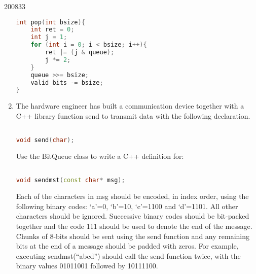 \documentclass[10pt,\jkfside,a4paper]{article}
\begin{document}
\begin{examquestion}{2008}{3}{3}
\begin{enumerate}[label=(\alph*)]
\begin{lstlisting}[language=C++]
int pop(int bsize){
	int ret = 0;
	int j = 1;
	for (int i = 0; i < bsize; i++){
		ret |= (j & queue);
		j *= 2;
	}
	queue >>= bsize;
	valid_bits -= bsize;
}

\end{lstlisting}

\item The hardware engineer has built a communication device together with a
C++ library function send to transmit data with the following declaration.

\begin{lstlisting}[language=C++]

void send(char);

\end{lstlisting}

Use the BitQueue class to write a C++ definition for:

\begin{lstlisting}[language=C++]

void sendmst(const char* msg);

\end{lstlisting}

Each of the characters in msg should be encoded, in index order, using the
following binary codes: `a'=0, `b'=10, `c'=1100 and `d'=1101. All other
characters should be ignored. Successive binary codes should be bit-packed
together and the code 111 should be used to denote the end of the message.
Chunks of 8-bits should be sent using the send function and any remaining
bits at the end of a message should be padded with zeros. For example,
executing sendmst(``abcd'') should call the send function twice, with the
binary values 01011001 followed by 10111100.


\end{enumerate}

\end{examquestion}
\end{document}
